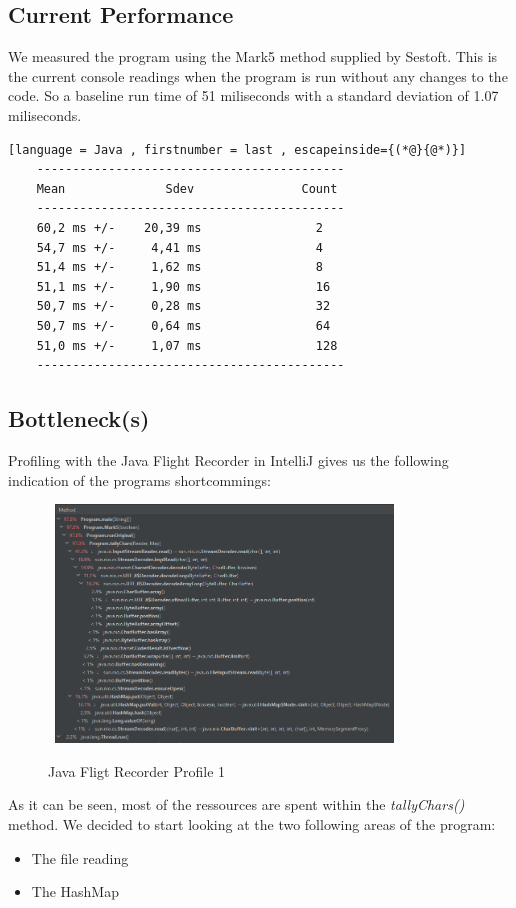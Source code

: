 \newpage
\subsection{Current Performance}
\label{sec:2.2}
We measured the program using the Mark5 method supplied by Sestoft.\cite{sestoft} \newline
This is the current console readings when the program is run without any changes to the code. 
So a baseline run time of 51 miliseconds with a standard deviation of 1.07 miliseconds. 
\begin{lstlisting}[language = Java , firstnumber = last , escapeinside={(*@}{@*)}]
    -------------------------------------------
    Mean              Sdev               Count
    -------------------------------------------
    60,2 ms +/-    20,39 ms                2
    54,7 ms +/-     4,41 ms                4
    51,4 ms +/-     1,62 ms                8
    51,1 ms +/-     1,90 ms                16
    50,7 ms +/-     0,28 ms                32
    50,7 ms +/-     0,64 ms                64
    51,0 ms +/-     1,07 ms                128
    -------------------------------------------
\end{lstlisting}

\subsection{Bottleneck(s)}
\label{sec:2.3}
Profiling with the Java Flight Recorder in IntelliJ gives us the following indication of the programs shortcommings:
\begin{figure}[H]
    \centering\
    \includegraphics[width = 0.8\textwidth ]{figures/profile1.PNG}
    \caption{Java Fligt Recorder Profile 1}
    \label{fig:p1}
\end{figure}
As it can be seen, most of the ressources are spent within the \emph{tallyChars()} method. We decided to start looking at the two following areas of the program:
\begin{itemize}
    \item The file reading
    \item The HashMap 
\end{itemize}

